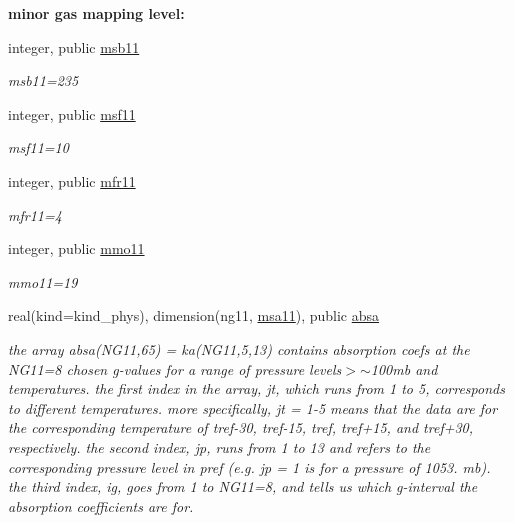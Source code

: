 \begin{Indent}\textbf{ minor gas mapping level\+:}\par
\begin{DoxyCompactItemize}
\item 
integer, public \hyperlink{group__module__radlw__kgbnn_gaa8630868015cb7e358107e6418e35276}{msb11}
\begin{DoxyCompactList}\small\item\em msb11=235 \end{DoxyCompactList}\item 
integer, public \hyperlink{group__module__radlw__kgbnn_ga7dcec9b9f19a3f5f13d443572d834628}{msf11}
\begin{DoxyCompactList}\small\item\em msf11=10 \end{DoxyCompactList}\item 
integer, public \hyperlink{group__module__radlw__kgbnn_ga9b5764441999cce52bc02e65a24420b9}{mfr11}
\begin{DoxyCompactList}\small\item\em mfr11=4 \end{DoxyCompactList}\item 
integer, public \hyperlink{group__module__radlw__kgbnn_ga6aabd24aa785ef8689c63b01aaaab243}{mmo11}
\begin{DoxyCompactList}\small\item\em mmo11=19 \end{DoxyCompactList}\item 
real(kind=kind\+\_\+phys), dimension(ng11, \hyperlink{namespacemodule__radlw__kgb11_afd15a7b87b3d49c53c12e023c604b360}{msa11}), public \hyperlink{group__module__radlw__kgbnn_ga7ac883387aa86a635c9aea011c55a1d5}{absa}
\begin{DoxyCompactList}\small\item\em the array absa(\+N\+G11,65) = ka(\+N\+G11,5,13) contains absorption coefs at the N\+G11=8 chosen g-\/values for a range of pressure levels$>$$\sim$100mb and temperatures. the first index in the array, jt, which runs from 1 to 5, corresponds to different temperatures. more specifically, jt = 1-\/5 means that the data are for the corresponding temperature of tref-\/30, tref-\/15, tref, tref+15, and tref+30, respectively. the second index, jp, runs from 1 to 13 and refers to the corresponding pressure level in pref (e.\+g. jp = 1 is for a pressure of 1053. mb). the third index, ig, goes from 1 to N\+G11=8, and tells us which g-\/interval the absorption coefficients are for. \end{DoxyCompactList}\item 

\end{DoxyCompactItemize}
\end{Indent}
